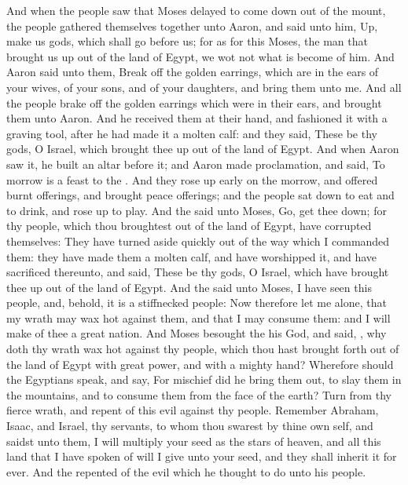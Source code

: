 \begin{biblechapter} %
 And when the people saw that Moses delayed to come down out of the mount, the people gathered themselves together unto Aaron, and said unto him, Up, make us gods, which shall go before us; for as for this Moses, the man that brought us up out of the land of Egypt, we wot not what is become of him.
\verse And Aaron said unto them, Break off the golden earrings, which are in the ears of your wives, of your sons, and of your daughters, and bring them unto me.
\verse And all the people brake off the golden earrings which were in their ears, and brought them unto Aaron.
\verse And he received them at their hand, and fashioned it with a graving tool, after he had made it a molten calf: and they said, These be thy gods, O Israel, which brought thee up out of the land of Egypt.
\verse And when Aaron saw it, he built an altar before it; and Aaron made proclamation, and said, To morrow is a feast to the \LORD.
\verse And they rose up early on the morrow, and offered burnt offerings, and brought peace offerings; and the people sat down to eat and to drink, and rose up to play.
\verse And the \LORD said unto Moses, Go, get thee down; for thy people, which thou broughtest out of the land of Egypt, have corrupted themselves:
\verse They have turned aside quickly out of the way which I commanded them: they have made them a molten calf, and have worshipped it, and have sacrificed thereunto, and said, These be thy gods, O Israel, which have brought thee up out of the land of Egypt.
\verse And the \LORD said unto Moses, I have seen this people, and, behold, it is a stiffnecked people:
\verse Now therefore let me alone, that my wrath may wax hot against them, and that I may consume them: and I will make of thee a great nation.
\verse And Moses besought the \LORD his God, and said, \LORD, why doth thy wrath wax hot against thy people, which thou hast brought forth out of the land of Egypt with great power, and with a mighty hand?
\verse Wherefore should the Egyptians speak, and say, For mischief did he bring them out, to slay them in the mountains, and to consume them from the face of the earth? Turn from thy fierce wrath, and repent of this evil against thy people.
\verse Remember Abraham, Isaac, and Israel, thy servants, to whom thou swarest by thine own self, and saidst unto them, I will multiply your seed as the stars of heaven, and all this land that I have spoken of will I give unto your seed, and they shall inherit it for ever.
\verse And the \LORD repented of the evil which he thought to do unto his people.

\end{biblechapter}
